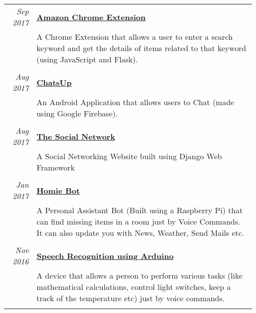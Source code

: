 \documentclass[a4paper,10pt]{article}
\begin{document}
\begin{tabular}{r|p{14.5cm}}
 \emph{Sep 2017} & \href{https://github.com/YashitM/Amazon-Chrome-Extension}{\textbf{Amazon Chrome Extension}} \\&\normalsize{A Chrome Extension that allows a user to enter a search keyword and get the details of items related to that keyword (using JavaScript and Flask).}\\\multicolumn{2}{c}{} \\
 \emph{Aug 2017} & \href{https://github.com/YashitM/ChatsUp}{\textbf{ChatsUp}} \\&\normalsize{An Android Application that allows users to Chat (made using Google Firebase).}\\\multicolumn{2}{c}{} \\ 
 \emph{Aug 2017} & \href{https://github.com/abhay-tyagi/Social_Network}{\textbf{The Social Network}} \\&\normalsize{A Social Networking Website built using Django Web Framework}\\\multicolumn{2}{c}{} \\
 \emph{Jan 2017} & \href{https://homiebot.yashitm.tech}{\textbf{Homie Bot}} \\&\normalsize{A Personal Assistant Bot (Built using a Raspberry Pi) that can find missing items in a room just by Voice Commands. It can also update you with News, Weather, Send Mails etc.}\\\multicolumn{2}{c}{} \\
 \emph{Nov 2016} & \href{https://github.com/YashitM/Arduino-Speech-Recog}{\textbf{Speech Recognition using Arduino}} \\&\normalsize{A device that allows a person to perform various tasks (like mathematical calculations, control light switches, keep a track of the temperature etc) just by voice commands.}\\\multicolumn{2}{c}{} \\
\end{tabular}

\end{document}
